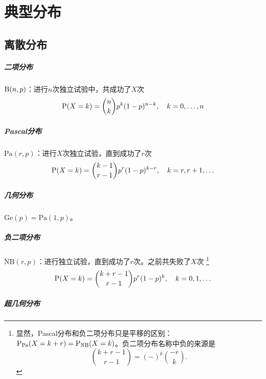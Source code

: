 \chapter{典型分布}

\section{离散分布}

\paragraph{二项分布}

$\Bino(n,p)$：进行$n$次独立\Bern 试验中，共成功了$X$次
\begin{equation}
	\P(X=k)=\binom nk p^k(1-p)^{n-k},\quad k=0,\ldots,n
\end{equation}

\paragraph{Pascal分布}

$\mathrm{Pa}(r,p)$：进行$X$次独立\Bern 试验，直到成功了$r$次
\begin{equation}
	\P(X=k)=\binom{k-1}{r-1}p^r(1-p)^{k-r},\quad k=r,r+1,\ldots
\end{equation}

\paragraph{几何分布}

$\mathrm{Ge}(p)=\mathrm{Pa}(1,p)$。

\paragraph{负二项分布}

$\mathrm{NB}(r,p)$：进行独立\Bern 试验，直到成功了$r$次。之前共失败了$X$次
\footnote{
	显然，Pascal分布和负二项分布只是平移的区别：$\P_{\mathrm{Pa}}(X=k+r)=\P_{\mathrm{NB}}(X=k)$。负二项分布名称中负的来源是
	\begin{equation}
		\binom{k+r-1}{r-1}=(-)^k\binom{-r}{k}.
	\end{equation}
}
\begin{equation}
	\P(X=k)=\binom{k+r-1}{r-1}p^r(1-p)^k,\quad k=0,1,\ldots
\end{equation}

\paragraph{超几何分布}

